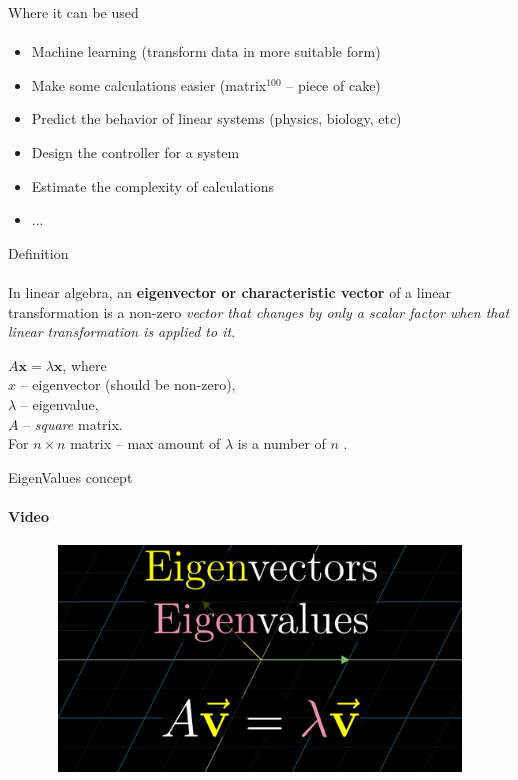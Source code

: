 \documentclass[aspectratio=169]{beamer}
\begin{document}
\begin{frame}[t]{Where it can be used}
\framesubtitle{}
\Large
    \begin{itemize}
        \item Machine learning (transform data in more suitable form)
        \item Make some calculations easier (matrix$^{100}$ – piece of cake)
        \item Predict the behavior of linear systems (physics, biology, etc)
        \item Design the controller for a system
        \item Estimate the complexity of calculations
        \item ...
    \end{itemize}
\end{frame}

\begin{frame}[t]{Definition}
\framesubtitle{}
\Large 
In linear algebra, an \textbf{eigenvector or characteristic vector }of a linear transformation is a non-zero \textit{vector that changes by only a scalar factor when that linear transformation is applied to it}. 
\bigskip

$ A\mathbf{x}=\lambda\mathbf{x}$, where \\ 
$x$ -- eigenvector (should be non-zero), \\ 
$\lambda$ -- eigenvalue, \\ 
$A$ -- \textit{square} matrix. \\ 
For $n \times n$ matrix -- max amount of $\lambda$ is a number of $n$ .
\end{frame}

\begin{frame}[t]{EigenValues concept}
    \framesubtitle{Video}
    \vspace{-0.6cm}
    \begin{figure}[H]
        \href{https://youtu.be/PFDu9oVAE-g}{
            \centering\includegraphics[height=6cm,width=1\textwidth,keepaspectratio]{eigenvideo_brown.jpg}}
        \label{fig:eigenvideo_brown.jpg}
    \end{figure}
\end{frame}
\end{document}
